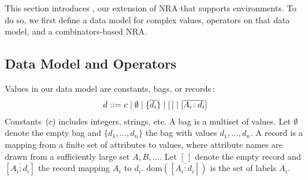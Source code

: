 \section{\NRAEnv}
\label{sec:nraenv}

This section introduces \NRAEnv, our extension of NRA that supports
environments. To do so, we first define a data model for complex
values, operators on that data model, and a combinators-based NRA.

\subsection{Data Model and Operators}
\label{sec:nraenv:data}


Values in our data model are constants, bags, or
records\,:
$$
\begin{array}{l@{\ }r@{\ }l}
d & ::= &
  c
  \mid \emptyset
  \mid \{\overline{d_i}\}
  \mid [\,]
  \mid [\overline{A_i\!:d_i}]
\end{array}
$$
Constants~($c$) includes integers, strings, etc. 
%
A bag is a multiset of values. Let $\emptyset$ denote the empty bag
and \mbox{$\{d_1,...,d_n\}$} the bag with values \mbox{$d_1,...,d_n$}.
%
A record is a mapping from a finite set of attributes to values, where
attribute names are drawn from a sufficiently large set
\mbox{$A,B,...$}.  Let $[\,]$ denote the empty record and
\mbox{$[\overline{A_i\!:d_i}]$} the record mapping $A_i$ to $d_i$.
$\textrm{dom}([\overline{A_i\!:d_i}])$ is the set of labels $A_i$.

